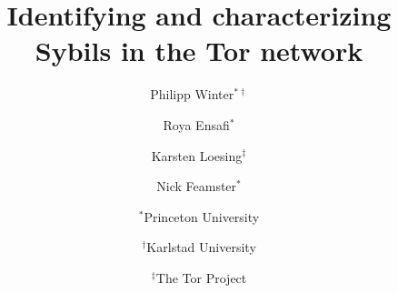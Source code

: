 \documentclass[letterpaper,twocolumn,10pt]{article}
\begin{document}
\date{}

\title{\Large \bf Identifying and characterizing Sybils in the Tor network}

\author{
{\rm Philipp Winter$^{*\dagger}$} \\
\and
{\rm Roya Ensafi$^{*}$} \\
\and
{\rm Karsten Loesing$^{\ddagger}$} \\
\and
{\rm Nick Feamster$^{*}$} \\
\and
$^{*}$Princeton University \\
\and
$^{\dagger}$Karlstad University \\
\and
$^{\ddagger}$The Tor Project
}

\maketitle

\thispagestyle{empty}



















\printbibliography


\end{document}
